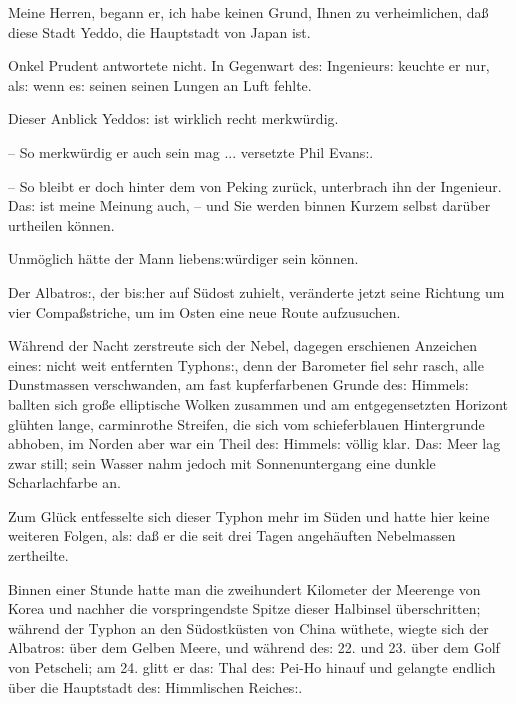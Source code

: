 \documentclass[oneside,12pt]{book}
\newcommand{\s}{s:}
\begin{document}
{\glqq}Meine Herren, begann er, ich habe keinen Grund, Ihnen zu
verheimlichen, da{\ss} diese Stadt Yeddo, die Hauptstadt von Japan
ist.{\grqq}

Onkel Prudent antwortete nicht. In Gegenwart de{\s} Ingenieur{\s}
keuchte er nur, al{\s} wenn e{\s} seinen seinen Lungen an Luft
fehlte.

{\glqq}Dieser Anblick Yeddo{\s} ist wirklich recht merkw\"urdig.

-- So merkw\"urdig er auch sein mag ... versetzte Phil Evan{\s}.

-- So bleibt er doch hinter dem von Peking zur\"uck, unterbrach ihn
der Ingenieur. Da{\s} ist meine Meinung auch, -- und Sie werden
binnen Kurzem selbst dar\"uber urtheilen k\"onnen.{\grqq}

Unm\"oglich h\"atte der Mann lieben{\s}w\"urdiger sein k\"onnen.

Der {\glqq}Albatro{\s}{\grqq}, der bi{\s}her auf S\"udost zuhielt,
ver\"anderte jetzt seine Richtung um vier Compa{\ss}striche, um im
Osten eine neue Route aufzusuchen.

W\"ahrend der Nacht zerstreute sich der Nebel, dagegen erschienen
Anzeichen eine{\s} nicht weit entfernten Typhon{\s}, denn der
Barometer fiel sehr rasch, alle Dunstmassen verschwanden, am fast
kupferfarbenen Grunde de{\s} Himmel{\s} ballten sich gro{\ss}e
elliptische Wolken zusammen und am entgegensetzten Horizont gl\"uhten
lange, carminrothe Streifen, die sich vom schieferblauen Hintergrunde
abhoben, im Norden aber war ein Theil de{\s} Himmel{\s} v\"ollig
klar. Da{\s} Meer lag zwar still; sein Wasser nahm jedoch mit
Sonnenuntergang eine dunkle Scharlachfarbe an.

Zum Gl\"uck entfesselte sich dieser Typhon mehr im S\"uden und hatte
hier keine weiteren Folgen, al{\s} da{\ss} er die seit drei Tagen
angeh\"auften Nebelmassen zertheilte.

Binnen einer Stunde hatte man die zweihundert Kilometer der Meerenge
von Korea und nachher die vorspringendste Spitze dieser Halbinsel
\"uberschritten; w\"ahrend der Typhon an den S\"udostk\"usten von
China w\"uthete, wiegte sich der {\glqq}Albatro{\s}{\grqq} \"uber dem
Gelben Meere, und w\"ahrend de{\s} 22. und 23. \"uber dem Golf von
Petscheli; am 24. glitt er da{\s} Thal de{\s} Pei-Ho hinauf und
gelangte endlich \"uber die Hauptstadt de{\s} Himmlischen Reiche{\s}.
\end{document}

